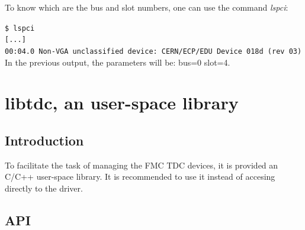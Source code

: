 \documentclass[a4paper,11pt]{article}
\begin{document}
To know which are the bus and slot numbers, one can use the command \textit{lspci}:

\indent\indent\texttt{\$ lspci} \\
\indent\indent\texttt{[...]} \\
\indent\indent\texttt{00:04.0 Non-VGA unclassified device: CERN/ECP/EDU Device 018d (rev 03)} \\
In the previous output, the parameters will be: bus=0 slot=4.


\section{libtdc, an user-space library}

\subsection{Introduction}

To facilitate the task of managing the FMC TDC devices, it is provided an C/C++
user-space library. It is recommended to use it instead of accesing directly to
the driver.

\subsection{API}
\end{document}
